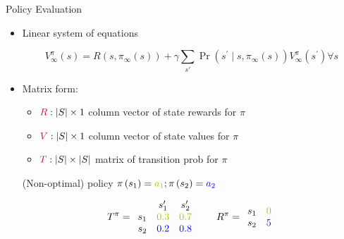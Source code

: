 \documentclass[11pt,table]{beamer}
\begin{document}
\begin{frame}{Policy Evaluation}

\begin{itemize}
\item  Linear system of equations


$$
V_{\infty}^{\pi}(s)=R\left(s, \pi_{\infty}(s)\right)+\gamma \sum_{s \prime} \operatorname{Pr}\left(s^{\prime} \mid s, \pi_{\infty}(s)\right) V_{\infty}^{\pi}\left(s^{\prime}\right) \forall s
$$

\item Matrix form:

    \begin{itemize}
        \item[] $\textcolor{red1}{R}:|S| \times 1$ column vector of state rewards for $\pi$
				\item[] $\textcolor{red1}{V}:|S| \times 1$ column vector of state values for $\pi$
				\item[] $\textcolor{red1}{T}:|S| \times|S|$ matrix of transition prob for $\pi$
    \end{itemize}

\vspace{3mm}

(Non-optimal) policy $\pi\left(s_{1}\right)=\textcolor{fu-green}{a_{1}} ; \pi\left(s_{2}\right)=\textcolor{blue}{a_{2}}$

$$
T^{\pi}=\begin{array}{ccc}
 & s_{1}^{\prime} & s_{2}^{\prime} \\
s_{1} & \textcolor{fu-green}{0.3} & \textcolor{fu-green}{0.7} \\
s_{2} & \textcolor{blue}{0.2} & \textcolor{blue}{0.8}
\end{array} \quad \quad R^{\pi}=\begin{array}{cc}
s_{1} & \textcolor{fu-green}{0} \\
s_{2} & \textcolor{blue}{5}
\end{array}
$$
\end{itemize}
    
\end{frame}
\end{document}

